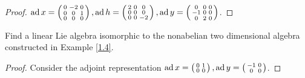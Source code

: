 \begin{proof}
  $\operatorname{ad} x=\begin{pmatrix}
           \begin{smallmatrix}
           0 & -2 & 0 \\
           0 & 0 & 1 \\
           0 & 0 & 0 \\
           \end{smallmatrix}
         \end{pmatrix}
  , \operatorname{ad} h=\begin{pmatrix}
           \begin{smallmatrix}
           2 & 0 & 0 \\
           0 & 0 & 0 \\
           0 & 0 & -2 \\
           \end{smallmatrix}
         \end{pmatrix}
  , \operatorname{ad} y=\begin{pmatrix}
           \begin{smallmatrix}
           0 & 0 & 0 \\
           -1 & 0 & 0 \\
           0 & 2 & 0 \\
           \end{smallmatrix}
         \end{pmatrix}$.
\end{proof}

\begin{ex}
  Find a linear Lie algebra isomorphic to the nonabelian two dimensional algebra constructed in Example \ref{1.4}.
\end{ex}
\begin{proof}
  Consider the adjoint representation $\operatorname{ad} x=\begin{pmatrix}
           \begin{smallmatrix}
           0 & 1\\
           0 & 0 \\
           \end{smallmatrix}
         \end{pmatrix}
  , \operatorname{ad} y=\begin{pmatrix}
           \begin{smallmatrix}
           -1 & 0\\
           0 & 0 \\
           \end{smallmatrix}
         \end{pmatrix}$.
\end{proof}

